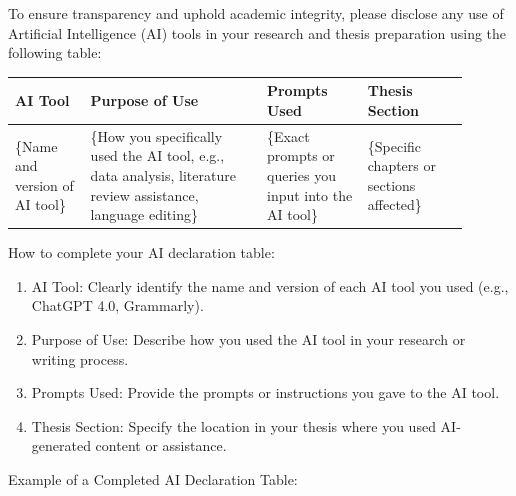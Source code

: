 \begin{instructional}


    To ensure transparency and uphold academic integrity, please disclose any use of Artificial Intelligence (AI) tools in your research and thesis preparation using the following table:\\

    \begin{table}[h]
        \begin{center}
        {\color{UQPurple}
        \begin{tabular}{|p{0.15\linewidth} | p{0.35\linewidth} | p{0.20\linewidth} | p{0.20\linewidth}|}
        \hline
        \textbf{AI Tool} & \textbf{Purpose of Use} & \textbf{Prompts Used} & \textbf{Thesis Section} \\ \hline
        \{Name and version of AI tool\} & 
        \{How you specifically used the AI tool, e.g., data analysis, literature review assistance, language editing\} & 
        \{Exact prompts or queries you input into the AI tool\} & 
        \{Specific chapters or sections affected\} \\ 
        \hline
        \end{tabular}
        }
        \end{center}
    \end{table}

    \noindent
    How to complete your AI declaration table:
    \begin{enumerate}
        \item AI Tool: Clearly identify the name and version of each AI tool you used (e.g., ChatGPT 4.0, Grammarly).
        \item Purpose of Use: Describe how you used the AI tool in your research or writing process.
        \item Prompts Used: Provide the prompts or instructions you gave to the AI tool.
        \item Thesis Section: Specify the location in your thesis where you used AI-generated content or assistance.
    \end{enumerate}

    \noindent
    Example of a Completed AI Declaration Table:
    

\end{instructional}
